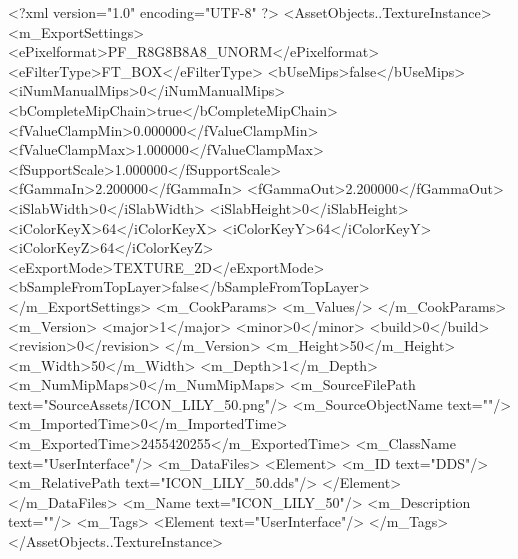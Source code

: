 <?xml version="1.0" encoding="UTF-8" ?>
<AssetObjects..TextureInstance>
	<m_ExportSettings>
		<ePixelformat>PF_R8G8B8A8_UNORM</ePixelformat>
		<eFilterType>FT_BOX</eFilterType>
		<bUseMips>false</bUseMips>
		<iNumManualMips>0</iNumManualMips>
		<bCompleteMipChain>true</bCompleteMipChain>
		<fValueClampMin>0.000000</fValueClampMin>
		<fValueClampMax>1.000000</fValueClampMax>
		<fSupportScale>1.000000</fSupportScale>
		<fGammaIn>2.200000</fGammaIn>
		<fGammaOut>2.200000</fGammaOut>
		<iSlabWidth>0</iSlabWidth>
		<iSlabHeight>0</iSlabHeight>
		<iColorKeyX>64</iColorKeyX>
		<iColorKeyY>64</iColorKeyY>
		<iColorKeyZ>64</iColorKeyZ>
		<eExportMode>TEXTURE_2D</eExportMode>
		<bSampleFromTopLayer>false</bSampleFromTopLayer>
	</m_ExportSettings>
	<m_CookParams>
		<m_Values/>
	</m_CookParams>
	<m_Version>
		<major>1</major>
		<minor>0</minor>
		<build>0</build>
		<revision>0</revision>
	</m_Version>
	<m_Height>50</m_Height>
	<m_Width>50</m_Width>
	<m_Depth>1</m_Depth>
	<m_NumMipMaps>0</m_NumMipMaps>
	<m_SourceFilePath text="SourceAssets/ICON_LILY_50.png"/>
	<m_SourceObjectName text=""/>
	<m_ImportedTime>0</m_ImportedTime>
	<m_ExportedTime>2455420255</m_ExportedTime>
	<m_ClassName text="UserInterface"/>
	<m_DataFiles>
		<Element>
			<m_ID text="DDS"/>
			<m_RelativePath text="ICON_LILY_50.dds"/>
		</Element>
	</m_DataFiles>
	<m_Name text="ICON_LILY_50"/>
	<m_Description text=""/>
	<m_Tags>
		<Element text="UserInterface"/>
	</m_Tags>
</AssetObjects..TextureInstance>

